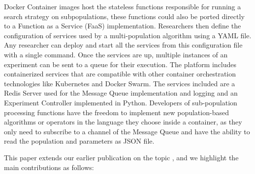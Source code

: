 \documentclass[review]{elsarticle}
\begin{document}
Docker Container images host the stateless functions responsible for running 
a search strategy on subpopulations, these functions could also be ported
directly to a Function as a Service (FaaS) \cite{Roberts2016} implementation.
Researchers then define the configuration of services used by
a multi-population algorithm using a YAML file. Any researcher can deploy and
start all the services from this configuration file with a single command. Once
the services are up, multiple instances of an experiment can be sent to a queue
for their execution. The platform includes containerized services that are
compatible with other container orchestration technologies like Kubernetes and
Docker Swarm. The services included are a Redis Server used for the Message
Queue implementation and logging and an Experiment Controller implemented in
Python. Developers of sub-population processing functions have the freedom to
implement new population-based algorithms or operators in the language they
choose inside a container, as they only need to subscribe to a channel of the
Message Queue and have the ability to read the population and parameters as JSON  
file.

This paper extends our earlier publication on the topic
\cite{guervos2018introducing}, and we highlight the main contributions as
follows:
\end{document}
